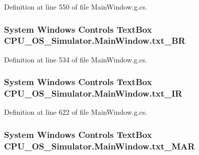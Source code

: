 Definition at line 550 of file Main\+Window.\+g.\+cs.

\hypertarget{class_c_p_u___o_s___simulator_1_1_main_window_a7a878022ed4cb948598d3685dc821a00}{}
\subsubsection[{txt\+\_\+\+B\+R}]{\setlength{\rightskip}{0pt plus 5cm}System Windows Controls Text\+Box C\+P\+U\+\_\+\+O\+S\+\_\+\+Simulator.\+Main\+Window.\+txt\+\_\+\+B\+R\hspace{0.3cm}{\ttfamily [package]}}\label{class_c_p_u___o_s___simulator_1_1_main_window_a7a878022ed4cb948598d3685dc821a00}


Definition at line 534 of file Main\+Window.\+g.\+cs.

\hypertarget{class_c_p_u___o_s___simulator_1_1_main_window_ac6e0cfcdd72688d7bffd100ce6d11a28}{}
\subsubsection[{txt\+\_\+\+I\+R}]{\setlength{\rightskip}{0pt plus 5cm}System Windows Controls Text\+Box C\+P\+U\+\_\+\+O\+S\+\_\+\+Simulator.\+Main\+Window.\+txt\+\_\+\+I\+R\hspace{0.3cm}{\ttfamily [package]}}\label{class_c_p_u___o_s___simulator_1_1_main_window_ac6e0cfcdd72688d7bffd100ce6d11a28}


Definition at line 622 of file Main\+Window.\+g.\+cs.

\hypertarget{class_c_p_u___o_s___simulator_1_1_main_window_a87f8440246e9f6ace0aa4d69b5bba289}{}
\subsubsection[{txt\+\_\+\+M\+A\+R}]{\setlength{\rightskip}{0pt plus 5cm}System Windows Controls Text\+Box C\+P\+U\+\_\+\+O\+S\+\_\+\+Simulator.\+Main\+Window.\+txt\+\_\+\+M\+A\+R\hspace{0.3cm}{\ttfamily [package]}}\label{class_c_p_u___o_s___simulator_1_1_main_window_a87f8440246e9f6ace0aa4d69b5bba289}



